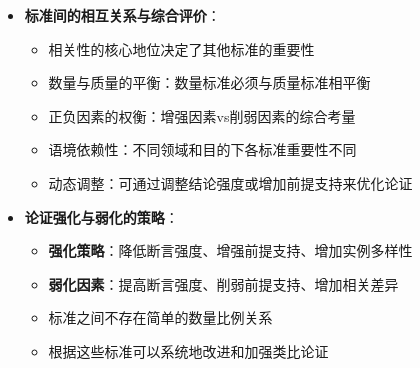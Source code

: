 \begin{center}
{{\begin{itemize}
\begin{itemize}
  \end{itemize}
\item \textbf{标准间的相互关系与综合评价}：
  \begin{itemize}
  \item 相关性的核心地位决定了其他标准的重要性
  \item 数量与质量的平衡：数量标准必须与质量标准相平衡
  \item 正负因素的权衡：增强因素vs削弱因素的综合考量
  \item 语境依赖性：不同领域和目的下各标准重要性不同
  \item 动态调整：可通过调整结论强度或增加前提支持来优化论证
  \end{itemize}
\item \textbf{论证强化与弱化的策略}：
  \begin{itemize}
  \item \textbf{强化策略}：降低断言强度、增强前提支持、增加实例多样性
  \item \textbf{弱化因素}：提高断言强度、削弱前提支持、增加相关差异
  \item 标准之间不存在简单的数量比例关系
  \item 根据这些标准可以系统地改进和加强类比论证
  \end{itemize}
\end{itemize}
}}
\end{center}